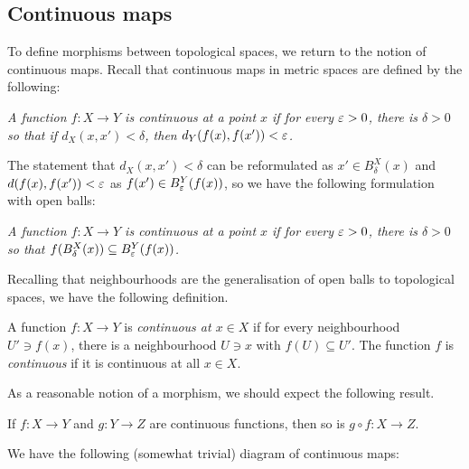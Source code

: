 \documentclass[11pt]{article}
\begin{document}

\subsection{Continuous maps}
To define morphisms between topological spaces, we return to the notion of continuous maps. Recall that continuous maps in metric spaces are defined by the following:
\begin{center}
    \emph{A function $f : X \to Y$ is continuous at a point $x$ if for every $\varepsilon > 0$, there is $\delta > 0$ so that if $d_X(x, x') < \delta$, then $d_Y(f(x), f(x')) < \varepsilon$.}
\end{center}
The statement that $d_X(x, x') < \delta$ can be reformulated as $x' \in B^X_\delta(x)$ and $d(f(x), f(x')) < \varepsilon$ as $f(x') \in B^Y_\varepsilon(f(x))$, so we have the following formulation with open balls:
\begin{center}
    \emph{A function $f : X \to Y$ is continuous at a point $x$ if for every $\varepsilon > 0$, there is $\delta > 0$ so that $f(B_\delta^X(x)) \subseteq B^Y_\varepsilon(f(x))$.}
\end{center}
Recalling that neighbourhoods are the generalisation of open balls to topological spaces, we have the following definition.
\begin{definition}[Continuous]
    A function $f : X \to Y$ is \emph{continuous at $x \in X$} if for every neighbourhood $U' \ni f(x)$, there is a neighbourhood $U \ni x$ with $f(U) \subseteq U'$. The function $f$ is \emph{continuous} if it is continuous at all $x \in X$.
\end{definition}
As a reasonable notion of a morphism, we should expect the following result.
\begin{lemma}
    If $f : X \to Y$ and $g : Y \to Z$ are continuous functions, then so is $g \circ f : X \to Z$.
\end{lemma}
We have the following (somewhat trivial) diagram of continuous maps:
\begin{center}
\end{center}
\end{document}
